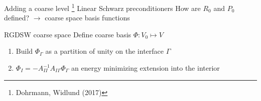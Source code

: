 \begin{frame}[noframenumbering]{Adding a coarse level \footnote{\tiny Dohrmann, Widlund (2017)}}
	{\Large Linear Schwarz preconditioners}
	How are $R_0$ and $P_0$ defined? $\rightarrow$ coarse space basis functions
	\begin{block}{RGDSW coarse space}
		Define coarse basis $\Phi : V_0\mapsto V$
		\begin{enumerate}
			\setlength{\itemsep}{10pt}
			\item Build $\Phi_\Gamma$ as a partition of unity on the interface $\Gamma$
			\item $\Phi_I = -A_{II}^{-1}A_{I\Gamma}\Phi_\Gamma$ an energy minimizing extension into the interior
		\end{enumerate}
	\end{block}
\end{frame}
